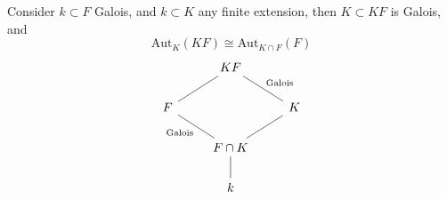 \documentclass[openany]{book}
\newcommand{\aut}{\text{Aut}}
\begin{document}
\begin{prop}
    Consider $k\subset F$ Galois, and $k\subset K$ any finite extension, then $K\subset KF$ is Galois, and 
    \begin{equation*}
        \aut_{K}(KF)\cong\aut_{K\cap F}(F)
    \end{equation*}
    \[\begin{tikzcd}
        & KF \\
        F && K \\
        & {F\cap K} \\
        & k
        \arrow[no head, from=2-1, to=1-2]
        \arrow["{\text{Galois}}"', no head, from=2-3, to=1-2]
        \arrow["{\text{Galois}}", no head, from=3-2, to=2-1]
        \arrow[no head, from=3-2, to=2-3]
        \arrow[no head, from=4-2, to=3-2]
    \end{tikzcd}\]
\end{prop}
\end{document}
